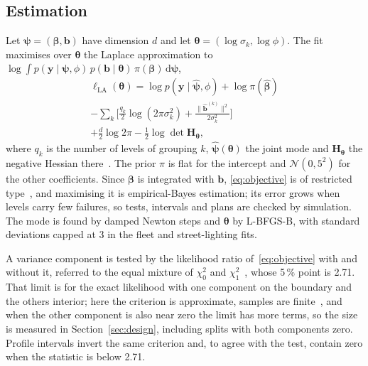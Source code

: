 \subsection{Estimation}
Let $\boldsymbol\psi=(\boldsymbol\beta,\mathbf b)$ have dimension $d$ and let
$\boldsymbol\theta=(\log\sigma_k,\log\phi)$. The fit maximises over
$\boldsymbol\theta$ the Laplace approximation to
$\log\int p(\mathbf y\mid\boldsymbol\psi,\phi)\,p(\mathbf b\mid\boldsymbol\theta)
\,\pi(\boldsymbol\beta)\,\mathrm d\boldsymbol\psi$,
\begin{multline}
\ell_{\mathrm{LA}}(\boldsymbol\theta)=\log p(\mathbf y\mid\hat{\boldsymbol\psi},\phi)
+\log\pi(\hat{\boldsymbol\beta})\\
-\sum_k\Big[\frac{q_k}{2}\log(2\pi\sigma_k^2)+\frac{\|\hat{\mathbf b}^{(k)}\|^2}{2\sigma_k^2}\Big]\\
+\frac d2\log 2\pi-\frac12\log\det\mathbf H_{\boldsymbol\theta},
\label{eq:objective}
\end{multline}
where $q_k$ is the number of levels of grouping $k$,
$\hat{\boldsymbol\psi}(\boldsymbol\theta)$ the joint mode and
$\mathbf H_{\boldsymbol\theta}$ the negative Hessian there~\cite{tierney1986}.
The prior $\pi$ is flat for the intercept and $\mathcal N(0,5^2)$ for the
other coefficients. Since $\boldsymbol\beta$ is integrated with $\mathbf b$,
\eqref{eq:objective} is of restricted type~\cite{breslow1993}, and maximising
it is empirical-Bayes estimation; its error grows when levels carry few
failures, so tests, intervals and plans are checked by simulation. The mode is
found by damped Newton steps and $\boldsymbol\theta$ by L-BFGS-B, with standard
deviations capped at 3 in the fleet and street-lighting fits.

A variance component is tested by the likelihood ratio of~\eqref{eq:objective}
with and without it, referred to the equal mixture of $\chi^2_0$ and
$\chi^2_1$~\cite{self1987}, whose 5\,\% point is 2.71. That limit is for the
exact likelihood with one component on the boundary and the others interior;
here the criterion is approximate, samples are finite~\cite{crainiceanu2004},
and when the other component is also near zero the limit has more terms, so
the size is measured in Section~\ref{sec:design}, including splits with both
components zero. Profile intervals invert the same criterion and, to agree with
the test, contain zero when the statistic is below 2.71.

